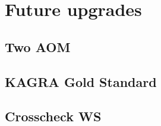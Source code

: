 
\chapter{Future upgrades} %

\label{Chapter7} %
\section{Two AOM}
\section{KAGRA Gold Standard}
\section{Crosscheck WS}

